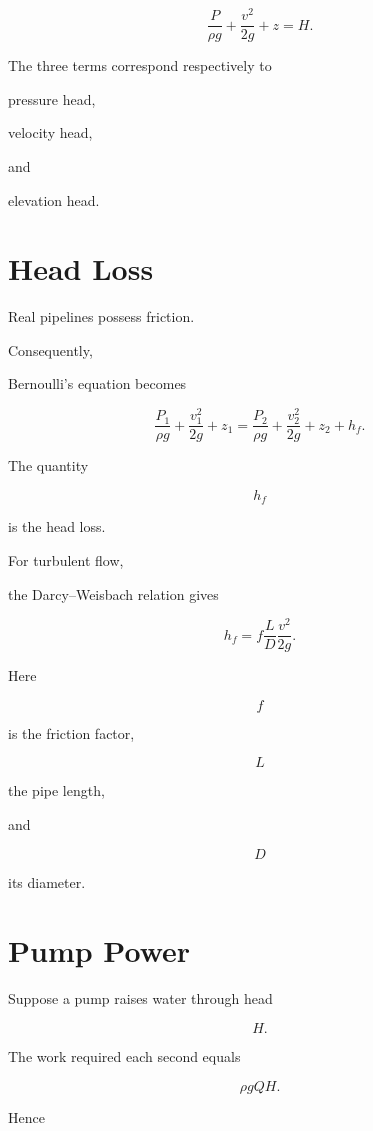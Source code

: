 \documentclass[11pt,fleqn]{book}
\numberwithin{equation}{chapter}
\theoremstyle{plain}
\theoremstyle{definition}
\theoremstyle{remark}
\begin{document}
\[
\boxed{
\frac{P}{\rho g}
+
\frac{v^2}{2g}
+
z
=
H.
}
\]

The three terms correspond respectively to

pressure head,

velocity head,

and

elevation head.


\section{Head Loss}

Real pipelines possess friction.

Consequently,

Bernoulli's equation becomes

\[
\frac{P_1}{\rho g}
+
\frac{v_1^2}{2g}
+
z_1
=
\frac{P_2}{\rho g}
+
\frac{v_2^2}{2g}
+
z_2
+
h_f.
\]

The quantity

\[
h_f
\]

is the head loss.


For turbulent flow,

the Darcy--Weisbach relation gives

\[
\boxed{
h_f
=
f
\frac{L}{D}
\frac{v^2}{2g}.
}
\]

Here

\[
f
\]

is the friction factor,

\[
L
\]

the pipe length,

and

\[
D
\]

its diameter.


\section{Pump Power}

Suppose a pump raises water through head

\[
H.
\]

The work required each second equals

\[
\rho gQH.
\]

Hence
\end{document}
